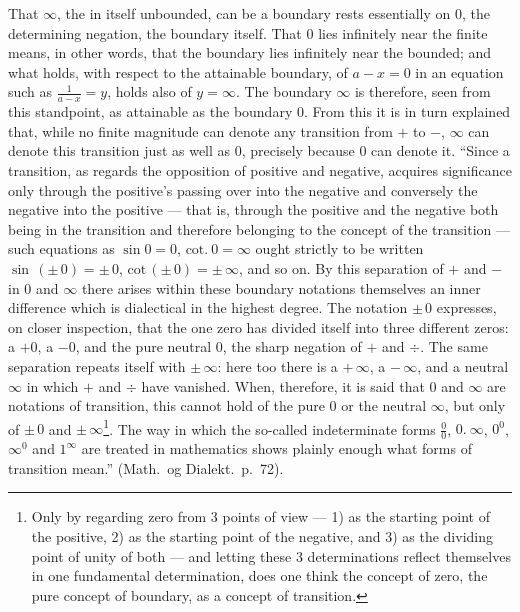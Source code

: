 \documentclass[12pt,a4paper]{book}
\begin{document}
That $\infty$, the in itself unbounded, can be a boundary rests essentially on
$0$, the determining negation, the boundary itself. That $0$ lies infinitely
near the finite means, in other words, that the boundary lies infinitely near
the bounded; and what holds, with respect to the attainable boundary, of
$a - x = 0$ in an equation such as $\frac{1}{a-x} = y$, holds also of
$y = \infty$. The boundary $\infty$ is therefore, seen from this standpoint, as
attainable as the boundary $0$. From this
\setcounter{footnote}{0}
it is in turn explained that, while no finite magnitude can denote any
transition from $+$ to $-$, $\infty$ can denote this transition just as well as
$0$, precisely because $0$ can denote it. ``Since a transition, as regards the
opposition of positive and negative, acquires significance only through the
positive's passing over into the negative and conversely the negative into the
positive --- that is, through the positive and the negative both being in the
transition and therefore belonging to the concept of the transition --- such
equations as $\sin 0 = 0$,
$\mathrm{cot.}\ 0 = \infty$ ought strictly to be written $\sin\,(\pm\,0) =
\pm\,0$, $\mathrm{cot}\,(\pm\,0) = \pm\,\infty$, and so on. By this separation
of $+$ and $-$ in $0$ and $\infty$ there arises within these boundary notations
themselves an inner difference which is dialectical in the highest degree. The
notation $\pm\,0$ expresses, on closer inspection, that the one zero has
divided itself into three different zeros: a $+0$, a
$-0$, and the pure neutral $0$, the sharp negation of $+$ and $\div$. The same
separation repeats itself with $\pm\,\infty$: here too there is a
$+\,\infty$, a $-\,\infty$, and a neutral $\infty$ in which $+$ and $\div$ have
vanished. When, therefore, it is said that $0$ and $\infty$ are notations of
transition, this cannot hold of the pure $0$ or the neutral $\infty$, but only
of $\pm\,0$ and $\pm\,\infty$\footnote{Only by regarding zero from 3 points of
view --- 1) as the starting point of the positive, 2) as the starting point of
the negative, and 3) as the dividing point of unity of both --- and letting
these 3 determinations reflect themselves in one fundamental determination,
does one think the concept of zero, the pure concept of boundary, as a concept
of transition.}. The way
in which the so-called indeterminate forms $\frac{0}{0}$, $0.\ \infty$,
$0^{0}$, $\infty^{0}$ and $1^{\infty}$ are treated in mathematics shows plainly
enough what forms of transition mean.'' (Math.\ og Dialekt.\ p.~72).
\end{document}
